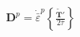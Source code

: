 \documentclass[preview]{standalone}
\begin{document}
\begin{align*}
\mathbf{D}^p = \dot{\bar{\varepsilon}}^p \left\{ \frac{\tilde{\mathbf{T}}'}{2\bar{\tau}} \right\}
\end{align*}
\end{document}
